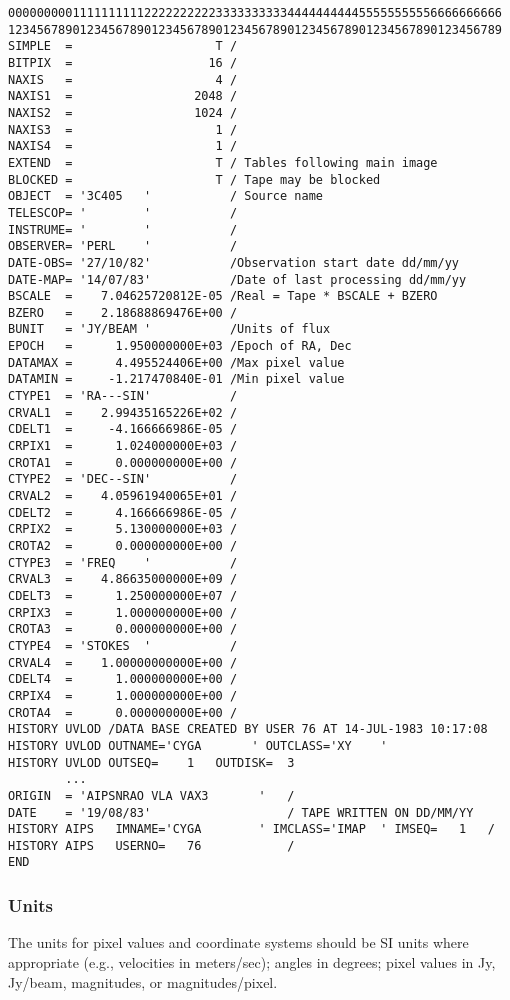 \begin{verbatim}
000000000111111111122222222223333333333444444444455555555556666666666
123456789012345678901234567890123456789012345678901234567890123456789
SIMPLE  =                    T /
BITPIX  =                   16 /
NAXIS   =                    4 /
NAXIS1  =                 2048 /
NAXIS2  =                 1024 /
NAXIS3  =                    1 /
NAXIS4  =                    1 /
EXTEND  =                    T / Tables following main image
BLOCKED =                    T / Tape may be blocked
OBJECT  = '3C405   '           / Source name
TELESCOP= '        '           /
INSTRUME= '        '           /
OBSERVER= 'PERL    '           /
DATE-OBS= '27/10/82'           /Observation start date dd/mm/yy
DATE-MAP= '14/07/83'           /Date of last processing dd/mm/yy
BSCALE  =    7.04625720812E-05 /Real = Tape * BSCALE + BZERO
BZERO   =    2.18688869476E+00 /
BUNIT   = 'JY/BEAM '           /Units of flux
EPOCH   =      1.950000000E+03 /Epoch of RA, Dec
DATAMAX =      4.495524406E+00 /Max pixel value
DATAMIN =     -1.217470840E-01 /Min pixel value
CTYPE1  = 'RA---SIN'           /
CRVAL1  =    2.99435165226E+02 /
CDELT1  =     -4.166666986E-05 /
CRPIX1  =      1.024000000E+03 /
CROTA1  =      0.000000000E+00 /
CTYPE2  = 'DEC--SIN'           /
CRVAL2  =    4.05961940065E+01 /
CDELT2  =      4.166666986E-05 /
CRPIX2  =      5.130000000E+03 /
CROTA2  =      0.000000000E+00 /
CTYPE3  = 'FREQ    '           /
CRVAL3  =    4.86635000000E+09 /
CDELT3  =      1.250000000E+07 /
CRPIX3  =      1.000000000E+00 /
CROTA3  =      0.000000000E+00 /
CTYPE4  = 'STOKES  '           /
CRVAL4  =    1.00000000000E+00 /
CDELT4  =      1.000000000E+00 /
CRPIX4  =      1.000000000E+00 /
CROTA4  =      0.000000000E+00 /
HISTORY UVLOD /DATA BASE CREATED BY USER 76 AT 14-JUL-1983 10:17:08
HISTORY UVLOD OUTNAME='CYGA       ' OUTCLASS='XY    '
HISTORY UVLOD OUTSEQ=    1   OUTDISK=  3
        ...
ORIGIN  = 'AIPSNRAO VLA VAX3       '   /
DATE    = '19/08/83'                   / TAPE WRITTEN ON DD/MM/YY
HISTORY AIPS   IMNAME='CYGA        ' IMCLASS='IMAP  ' IMSEQ=   1   /
HISTORY AIPS   USERNO=   76            /
END

\end{verbatim}

\subsubsection{Units }
The units for pixel values and coordinate systems should be SI units
where appropriate (e.g., velocities in meters/sec); angles in degrees;
pixel values in Jy, Jy/beam, magnitudes, or magnitudes/pixel.

